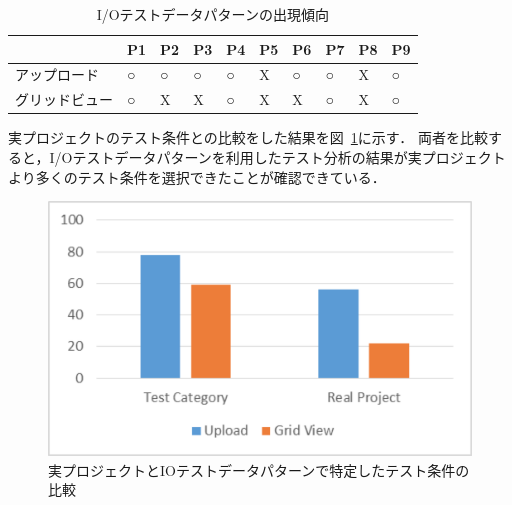 \begin{table}[htbp]
  \centering
  \caption{I/Oテストデータパターンの出現傾向}
    \begin{tabular}{|p{7em}|p{1.7em}|p{1.7em}|p{1.7em}|p{1.7em}|p{1.7em}|p{1.7em}|p{1.7em}|p{1.7em}|p{1.7em}|}
    \hline
    \multicolumn{1}{|r|}{} & \multicolumn{1}{l|}{P1} & \multicolumn{1}{l|}{P2} & \multicolumn{1}{l|}{P3} & \multicolumn{1}{l|}{P4} & \multicolumn{1}{l|}{P5} & \multicolumn{1}{l|}{P6} & \multicolumn{1}{l|}{P7} & \multicolumn{1}{l|}{P8} & \multicolumn{1}{l|}{P9} \bigstrut\\
    \hline
    アップロード & ○     & ○     & ○     & ○     & X     & ○     & ○     & X     & ○ \bigstrut\\
    \hline
    グリッドビュー & ○     & X     & X     & ○     & X     & X     & ○     & X     & ○ \bigstrut\\
    \hline
    \end{tabular}%
  \label{tab:D-4-IOresult}%
\end{table}%

実プロジェクトのテスト条件との比較をした結果を図~\ref{fig:D-4-Fig10}に示す．
両者を比較すると，I/Oテストデータパターンを利用したテスト分析の結果が実プロジェクトより多くのテスト条件を選択できたことが確認できている．

\begin{figure}[htbp]
\begin{center}
\includegraphics[width=12cm]{./image/D-4-Fig10.png}
\caption{実プロジェクトとIOテストデータパターンで特定したテスト条件の比較}
\label{fig:D-4-Fig10}
\end{center}
\end{figure}

